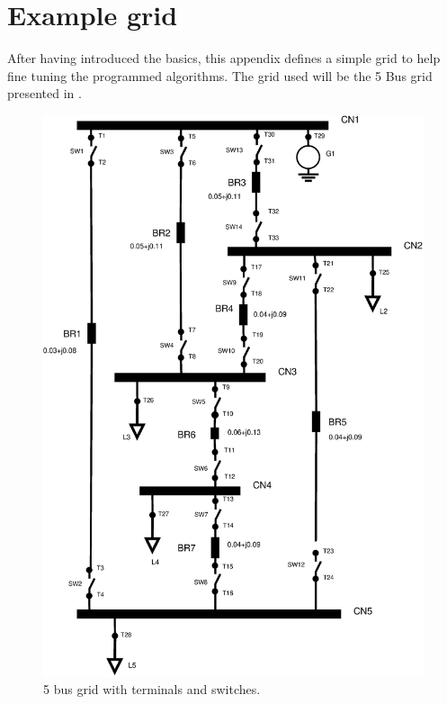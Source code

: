 \documentclass[nols,a4paper,twoside,notoc,fleqn]{tufte-book}
\begin{document}




\appendix
\chapter{Example grid}

After having introduced the basics, this appendix defines a simple grid to help fine tuning the programmed algorithms. The grid used will be the 5 Bus grid presented in \cite{powell2004power}.

\begin{figure}[h!]
	\centering
	\includegraphics[width=0.7\linewidth]{img/Lynn5Bus.eps}
	\caption{5 bus grid with terminals and switches.}
	\label{fig:IEEE5}
\end{figure}
\end{document}
